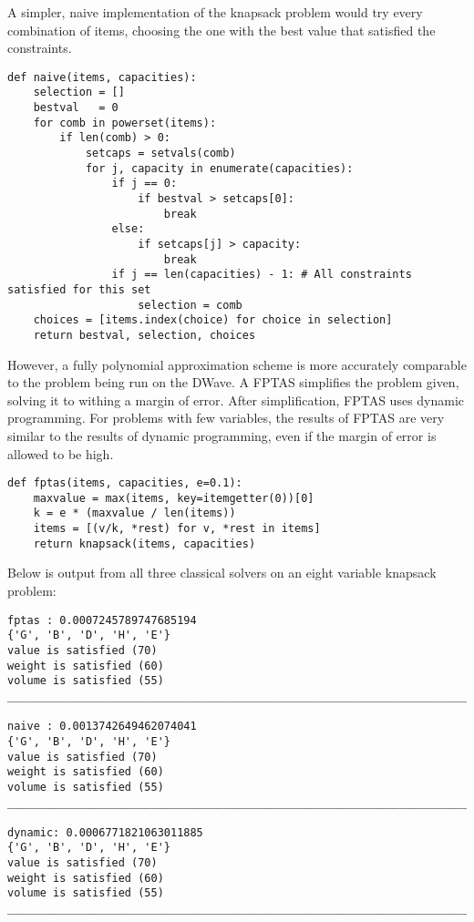 \documentclass{article}
\begin{document}
\newpage

A simpler, naive implementation of the knapsack problem would try every combination of items, choosing the one with the best value that satisfied the constraints.

\lstset{language=Python}
\begin{lstlisting}
def naive(items, capacities):
    selection = []
    bestval   = 0
    for comb in powerset(items):
        if len(comb) > 0:
            setcaps = setvals(comb)
            for j, capacity in enumerate(capacities):
                if j == 0:
                    if bestval > setcaps[0]:
                        break
                else:
                    if setcaps[j] > capacity:
                        break
                if j == len(capacities) - 1: # All constraints satisfied for this set
                    selection = comb
    choices = [items.index(choice) for choice in selection]
    return bestval, selection, choices
\end{lstlisting}

\newpage

However, a fully polynomial approximation scheme is more accurately comparable to the problem being run on the DWave.
A FPTAS simplifies the problem given, solving it to withing a margin of error.
After simplification, FPTAS uses dynamic programming.
For problems with few variables, the results of FPTAS are very similar to the results of dynamic programming, even if the margin of error is allowed to be high.

\lstset{language=Python}
\begin{lstlisting}
def fptas(items, capacities, e=0.1):
    maxvalue = max(items, key=itemgetter(0))[0]
    k = e * (maxvalue / len(items))
    items = [(v/k, *rest) for v, *rest in items]
    return knapsack(items, capacities)
\end{lstlisting}

\newpage

Below is output from all three classical solvers on an eight variable knapsack problem:

\begin{verbatim}
fptas : 0.0007245789747685194
{'G', 'B', 'D', 'H', 'E'}
value is satisfied (70)
weight is satisfied (60)
volume is satisfied (55)
________________________________________________________________________________

naive : 0.0013742649462074041
{'G', 'B', 'D', 'H', 'E'}
value is satisfied (70)
weight is satisfied (60)
volume is satisfied (55)
________________________________________________________________________________

dynamic: 0.0006771821063011885
{'G', 'B', 'D', 'H', 'E'}
value is satisfied (70)
weight is satisfied (60)
volume is satisfied (55)
________________________________________________________________________________
\end{verbatim}
\end{document}

